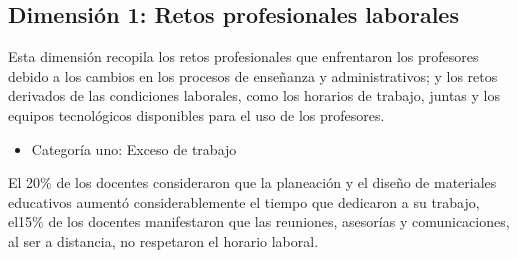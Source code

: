 \documentclass[spanish]{textolivre}
\begin{document}
\subsection{Dimensión 1: Retos profesionales laborales}
Esta dimensión recopila los retos profesionales que enfrentaron los profesores debido a los cambios en los procesos de enseñanza y administrativos; y los retos derivados de las condiciones laborales, como los horarios de trabajo, juntas y los equipos tecnológicos disponibles para el uso de los profesores.

\begin{itemize}
 \item Categoría uno: Exceso de trabajo
\end{itemize}

El 20\% de los docentes consideraron que la planeación y el diseño de materiales educativos aumentó considerablemente el tiempo que dedicaron a su trabajo, el15\% de los docentes manifestaron que las reuniones, asesorías y comunicaciones, al ser a distancia, no respetaron el horario laboral.
\end{document}
